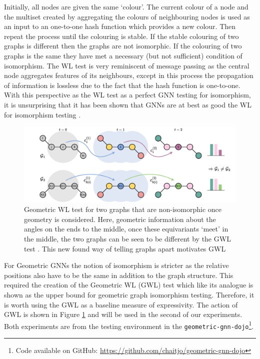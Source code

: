 Initially, all nodes are given the same `colour'. The current colour of a node and the multiset created by aggregating the colours of neighbouring nodes is used as an input to an one-to-one hash function which provides a new colour. Then repeat the process until the colouring is stable. If the stable colouring of two graphs is different then the graphs are not isomorphic. If the colouring of two graphs is the same they have met a necessary (but not sufficient) condition of isomorphism. The WL test is very reminiscent of message passing as the central node aggregates features of its neighbours, except in this process the propagation of information is lossless due to the fact that the hash function is one-to-one. With this perspective as the WL test as a perfect GNN testing for isomorphism, it is unsurprising that it has been shown that GNNs are at best as good the WL for isomorphism testing \cite{xu2018powerful}.

\begin{figure}[H]
    \centering
    \includegraphics[width=\textwidth]{figures/gwl.pdf}
    \caption{Geometric WL test for two graphs that are non-isomorphic once geometry is considered. Here, geometric information about the angles on the ends to the middle, once these equivariants `meet' in the middle, the two graphs can be seen to be different by the GWL test \cite{joshi2023expressive}. This new found way of telling graphs apart motivates GWL}
    \label{fig:gwl}
\end{figure}

For Geometric GNNs the notion of isomorphism is stricter as the relative positions also have to be the same in addition to the graph structure. This required the creation of the Geometric WL (GWL) test \cite{joshi2023expressive} which like its analogue is shown as the upper bound for geometric graph isomorphism testing. Therefore, it is worth using the GWL as a baseline measure of expressivity. The action of GWL is shown in Figure \ref{fig:gwl} and will be used in the second of our experiments. Both experiments are from the testing environment in the \texttt{geometric-gnn-dojo}\footnote{Code available on GitHub: \url{https://github.com/chaitjo/geometric-gnn-dojo}}.

